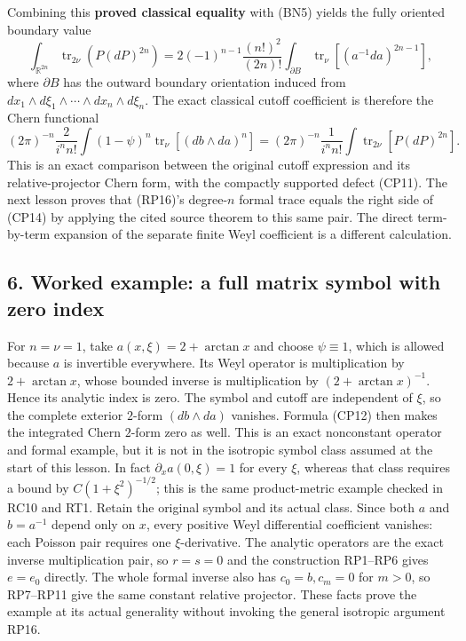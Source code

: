 \documentclass[
  11pt,
]{article}
\begin{document}
Combining this \textbf{proved classical equality} with (BN5) yields the
fully oriented boundary value \[
 \int_{\mathbb R^{2n}}\operatorname{tr}_{2\nu}
        \!\left(P(dP)^{2n}\right)
 =2(-1)^{n-1}\frac{(n!)^2}{(2n)!}
   \int_{\partial B}\operatorname{tr}_\nu[(a^{-1}da)^{2n-1}],
 \tag{CP13}
\] where \(\partial B\) has the outward boundary orientation induced
from \(dx_1\wedge d\xi_1\wedge\cdots\wedge dx_n\wedge d\xi_n\). The
exact classical cutoff coefficient is therefore the Chern functional \[
 (2\pi)^{-n}\frac{2}{i^n n!}
  \int(1-\psi)^n\operatorname{tr}_\nu[(db\wedge da)^n]
 =(2\pi)^{-n}\frac{1}{i^n n!}
  \int\operatorname{tr}_{2\nu}[P(dP)^{2n}].
 \tag{CP14}
\] This is an exact comparison between the original cutoff expression
and its relative-projector Chern form, with the compactly supported
defect (CP11). The next lesson proves that (RP16)'s degree-\(n\) formal
trace equals the right side of (CP14) by applying the cited source
theorem to this same pair. The direct term-by-term expansion of the
separate finite Weyl coefficient is a different calculation.

\subsection{6. Worked example: a full matrix symbol with zero
index}\label{worked-example-a-full-matrix-symbol-with-zero-index}

For \(n=\nu=1\), take \(a(x,\xi)=2+\arctan x\) and choose
\(\psi\equiv1\), which is allowed because \(a\) is invertible
everywhere. Its Weyl operator is multiplication by \(2+\arctan x\),
whose bounded inverse is multiplication by \((2+\arctan x)^{-1}\). Hence
its analytic index is zero. The symbol and cutoff are independent of
\(\xi\), so the complete exterior \(2\)-form \((db\wedge da)\) vanishes.
Formula (CP12) then makes the integrated Chern \(2\)-form zero as well.
This is an exact nonconstant operator and formal example, but it is not
in the isotropic symbol class assumed at the start of this lesson. In
fact \(\partial_xa(0,\xi)=1\) for every \(\xi\), whereas that class
requires a bound by \(C(1+\xi^2)^{-1/2}\); this is the same
product-metric example checked in RC10 and RT1. Retain the original
symbol and its actual class. Since both \(a\) and \(b=a^{-1}\) depend
only on \(x\), every positive Weyl differential coefficient vanishes:
each Poisson pair requires one \(\xi\)-derivative. The analytic
operators are the exact inverse multiplication pair, so \(r=s=0\) and
the construction RP1--RP6 gives \(e=e_0\) directly. The whole formal
inverse also has \(c_0=b,c_m=0\) for \(m>0\), so RP7--RP11 give the same
constant relative projector. These facts prove the example at its actual
generality without invoking the general isotropic argument RP16.
\end{document}
